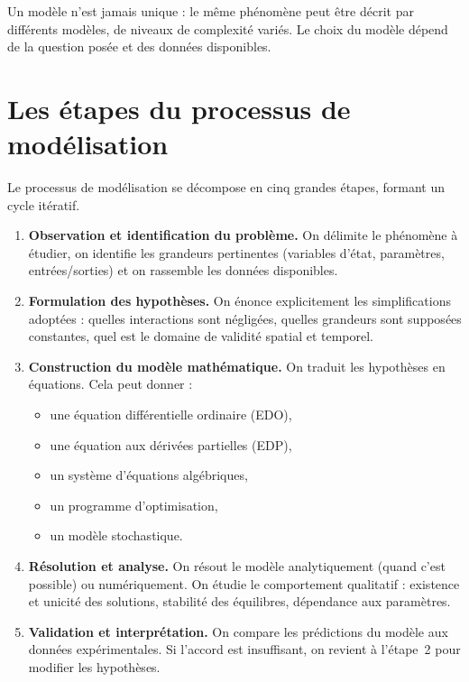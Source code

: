 \begin{remarque}
Un mod\`ele n'est jamais unique : le m\^eme ph\'enom\`ene peut \^etre
d\'ecrit par diff\'erents mod\`eles, de niveaux de complexit\'e vari\'es.
Le choix du mod\`ele d\'epend de la question pos\'ee et des donn\'ees
disponibles.
\end{remarque}

\section{Les \'etapes du processus de mod\'elisation}
\label{sec:etapes}

Le processus de mod\'elisation se d\'ecompose en cinq grandes \'etapes,
formant un cycle it\'eratif.

\begin{enumerate}
  \item \textbf{Observation et identification du probl\`eme.}
    On d\'elimite le ph\'enom\`ene \`a \'etudier, on identifie les grandeurs
    pertinentes (variables d'\'etat, param\`etres, entr\'ees/sorties)
    et on rassemble les donn\'ees disponibles.

  \item \textbf{Formulation des hypoth\`eses.}
    On \'enonce explicitement les simplifications adopt\'ees :
    quelles interactions sont n\'eglig\'ees, quelles grandeurs sont
    suppos\'ees constantes, quel est le domaine de validit\'e spatial
    et temporel.

  \item \textbf{Construction du mod\`ele math\'ematique.}
    On traduit les hypoth\`eses en \'equations.  Cela peut donner :
    \begin{itemize}
      \item une \'equation diff\'erentielle ordinaire (EDO),
      \item une \'equation aux d\'eriv\'ees partielles (EDP),
      \item un syst\`eme d'\'equations alg\'ebriques,
      \item un programme d'optimisation,
      \item un mod\`ele stochastique.
    \end{itemize}

  \item \textbf{R\'esolution et analyse.}
    On r\'esout le mod\`ele analytiquement (quand c'est possible) ou
    num\'eriquement.  On \'etudie le comportement qualitatif :
    existence et unicit\'e des solutions, stabilit\'e des \'equilibres,
    d\'ependance aux param\`etres.

  \item \textbf{Validation et interpr\'etation.}
    On compare les pr\'edictions du mod\`ele aux donn\'ees exp\'erimentales.
    Si l'accord est insuffisant, on revient \`a l'\'etape~2 pour modifier
    les hypoth\`eses.
\end{enumerate}


